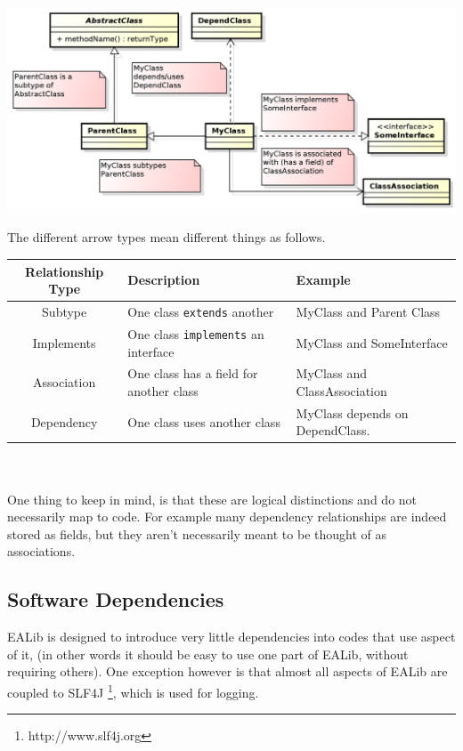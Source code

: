 \documentclass[11pt,letterpaper,oneside]{article}
\begin{document}
\begin{center}
\includegraphics[scale=0.65]{img/UML/ClassDiagram.png}
\end{center}

The different arrow types mean different things as follows.

\begin{tabular}{c | l | l}
Relationship Type & Description & Example\\
\hline
\hline
Subtype & One class \texttt{extends} another & MyClass and Parent Class\\
Implements & One class \texttt{implements} an interface & MyClass and SomeInterface\\
Association & One class has a field for another class & MyClass and ClassAssociation\\
Dependency & One class uses another class & MyClass depends on DependClass.\\
\hline
\end{tabular}
~\\~
\\

\vspace{5pt}
One thing to keep in mind, is that these are logical distinctions and do not necessarily map to code. For example many dependency relationships are indeed stored as fields, but they aren't necessarily meant to be thought of as associations.




\subsection{Software Dependencies}

EALib is designed to introduce very little dependencies into codes that use aspect of it, (in other words it should be easy to use one part of EALib, without requiring others). One exception however is that almost all aspects of EALib are coupled to SLF4J \footnote{http://www.slf4j.org}, which is used for logging.
\end{document}
